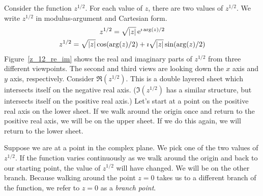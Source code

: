 








\begin{Example}
  Consider the function $z^{1/2}$.  For each value of $z$, there are
  two values of $z^{1/2}$.  We write $z^{1/2}$ in modulus-argument and 
  Cartesian form.
  \begin{gather*}
    z^{1/2} = \sqrt{|z|} \mathop{\mathrm{e}}\nolimits^{\imath \arg(z) / 2} 
    \\
    z^{1/2} = \sqrt{|z|} \cos(\arg(z) / 2) + \imath \sqrt{|z|} \sin(\arg(z) / 2)
  \end{gather*}
  Figure~\ref{z_12_re_im} shows the real and imaginary
  parts of $z^{1/2}$ from three different viewpoints.  The second and
  third views are looking down the $x$ axis and $y$ axis,
  respectively.  Consider $\Re \left( z^{1/2} \right)$.  This is a
  double layered sheet which intersects itself on the negative real
  axis.  ($\Im(z^{1/2})$ has a similar structure, but intersects itself
  on the positive real axis.)  Let's start at a point on the positive
  real axis on the lower sheet.  If we walk around the origin once and
  return to the positive real axis, we will be on the upper sheet.  If
  we do this again, we will return to the lower sheet.

  Suppose we are at a point in the complex plane.  We pick one of the
  two values of $z^{1/2}$.  If the function varies continuously as we
  walk around the origin and back to our starting point, the value of
  $z^{1/2}$ will have changed.  We will be on the other branch.
  Because walking around the point $z = 0$ takes us to a different
  branch of the function, we refer to $z = 0$ as a \textit{branch
  point}.


\end{Example}
